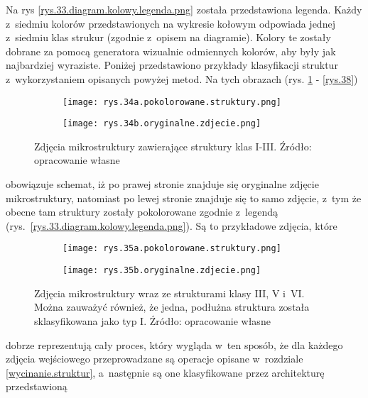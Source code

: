Na rys \ref{rys.33.diagram.kolowy.legenda.png} została przedstawiona legenda. Każdy z~siedmiu kolorów przedstawionych na wykresie kołowym odpowiada jednej z~siedmiu klas strukur (zgodnie z~opisem na diagramie). Kolory te zostały dobrane za pomocą generatora wizualnie odmiennych kolorów, aby były jak najbardziej wyraziste. Poniżej przedstawiono przykłady klasyfikacji struktur z~wykorzystaniem opisanych powyżej metod. Na tych obrazach (rys. \ref{rys.34} - \ref{rys.38}) 
\begin{figure}[h]
	\centering
	\begin{subfigure}{0.42\textwidth}
	    \centering
	    \texttt{[image: rys.34a.pokolorowane.struktury.png]}
	\end{subfigure}
	\begin{subfigure}{0.42\textwidth}
	    \centering
	    \texttt{[image: rys.34b.oryginalne.zdjecie.png]}
	\end{subfigure}
	\caption{\label{rys.34}Zdjęcia mikrostruktury zawierające struktury klas I-III. Źródło: opracowanie własne}
\end{figure}
obowiązuje schemat, iż po prawej stronie znajduje się oryginalne zdjęcie mikrostruktury, natomiast po lewej stronie znajduje się to samo zdjęcie, z~tym że obecne tam struktury zostały pokolorowane zgodnie z~legendą (rys.~\ref{rys.33.diagram.kolowy.legenda.png}). Są to przykładowe zdjęcia, które 
\begin{figure}[h]
	\centering
	\begin{subfigure}{0.42\textwidth}
	    \centering
	    \texttt{[image: rys.35a.pokolorowane.struktury.png]}
	\end{subfigure}
	\begin{subfigure}{0.42\textwidth}
	    \centering
	    \texttt{[image: rys.35b.oryginalne.zdjecie.png]}
	\end{subfigure}
	\caption{\label{rys.35}Zdjęcia mikrostruktury wraz ze strukturami klasy III, V i~VI. Można zauważyć również, że jedna, podłużna struktura została sklasyfikowana jako typ I. Źródło: opracowanie własne}
\end{figure}
dobrze reprezentują cały proces, który wygląda w~ten sposób, że dla każdego zdjęcia wejściowego przeprowadzane są operacje opisane w~rozdziale \ref{wycinanie.struktur}, a~następnie są one klasyfikowane przez architekturę przedstawioną
